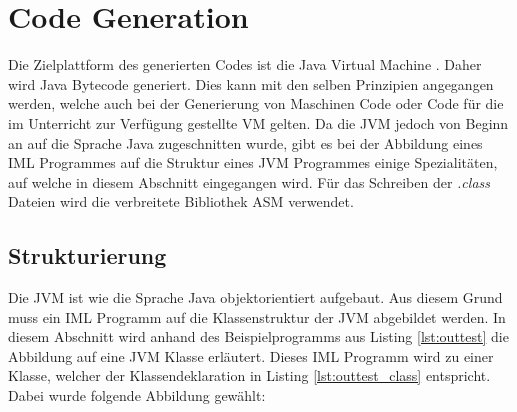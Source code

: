 \section{Code Generation}

Die Zielplattform des generierten Codes ist die Java Virtual Machine \cite{ORACLE:JVM}. Daher
wird Java Bytecode generiert. Dies kann mit den selben Prinzipien angegangen werden, welche auch
bei der Generierung von Maschinen Code oder Code für die im Unterricht zur Verfügung gestellte 
VM gelten. Da die JVM jedoch von Beginn an auf die Sprache Java zugeschnitten wurde, gibt es bei
der Abbildung eines IML Programmes auf die Struktur eines JVM Programmes einige Spezialitäten, 
auf welche in diesem Abschnitt eingegangen wird. Für das Schreiben der \textit{.class} Dateien wird
die verbreitete Bibliothek ASM \cite{OW2:ASM} verwendet.

\subsection {Strukturierung}

Die JVM ist wie die Sprache Java objektorientiert aufgebaut. Aus diesem Grund muss ein 
IML Programm auf die Klassenstruktur der JVM abgebildet werden. In diesem Abschnitt wird 
anhand des Beispielprogramms aus Listing \ref{lst:outtest} die Abbildung auf eine JVM Klasse
erläutert. Dieses IML Programm wird zu einer Klasse, welcher der Klassendeklaration in Listing 
\ref{lst:outtest_class} entspricht. Dabei wurde folgende Abbildung gewählt:

